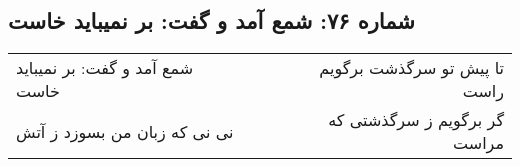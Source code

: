 \begin{center}
\section*{شماره ۷۶: شمع‌ آمد و گفت: بر نمیباید خاست}
\label{sec:076}
\begin{longtable}{l p{0.5cm} r}
شمع‌ آمد و گفت: بر نمیباید خاست
&&
تا پیش تو سرگذشت برگویم راست
\\
نی نی که زبان من بسوزد ز آتش
&&
گر برگویم ز سرگذشتی که مراست
\\
\end{longtable}
\end{center}
